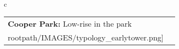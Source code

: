 \begin{table}[H]
        \begin{tabular}{c}
        \begin{tabular}{m{1.5in} m{2in}}
\textbf{Cooper Park:} {Low-rise in the park} & \texttt{[image: \\rootpath/IMAGES/typology\_earlytower.png]}
\end{tabular}\end{tabular}
        \end{table}
